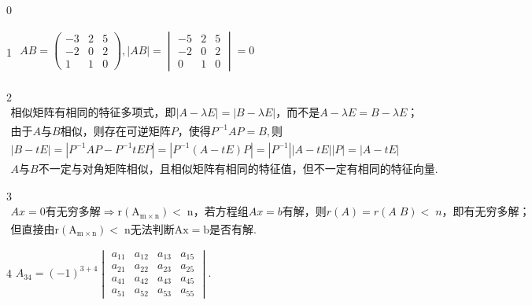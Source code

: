 
0



1
$\begin{array}{l}AB=\begin{pmatrix}-3&2&5\\-2&0&2\\1&1&0\end{pmatrix},\left|AB\right|=\begin{vmatrix}-5&2&5\\-2&0&2\\0&1&0\end{vmatrix}=0\\\end{array}$


2
$\begin{array}{l}\mathrm{相似矩阵有相同的特征多项式}，即\left|A-\lambda E\right|=\left|B-\lambda E\right|，\mathrm{而不是}A-\lambda E=B-\lambda E；\\\mathrm{由于}A与B\mathrm{相似}，\mathrm{则存在可逆矩阵}P，\mathrm{使得}P^{-1}AP=B,则\\\left|B-tE\right|=\left|P^{-1}AP-P^{-1}tEP\right|=\left|P^{-1}(A-tE)P\right|=\left|P^{-1}\right|\left|A-tE\right|\left|P\right|=\left|A-tE\right|\\A与B\mathrm{不一定与对角矩阵相似}，\mathrm{且相似矩阵有相同的特征值}，\mathrm{但不一定有相同的特征向量}.\end{array}$


3
$\begin{array}{l}Ax=0\mathrm{有无穷多解}\Rightarrow\mathrm r\left({\mathrm A}_{\mathrm m\times\mathrm n}\right)<\;\mathrm n，\mathrm{若方程组}Ax=b\mathrm{有解}，则r\left(A\right)=r\left(A\;B\right)<\;n，\mathrm{即有无穷多解}；\\\mathrm{但直接由r}\left({\mathrm A}_{\mathrm m\times\mathrm n}\right)<\;\mathrm{n无法判断Ax}=\mathrm{b是否有解}.\end{array}$


4
$A_{34}=\left(-1\right)^{3+4}\begin{vmatrix}a_{11}&a_{12}&a_{13}&a_{15}\\a_{21}&a_{22}&a_{23}&a_{25}\\a_{41}&a_{42}&a_{43}&a_{45}\\a_{51}&a_{52}&a_{53}&a_{55}\end{vmatrix}.$


